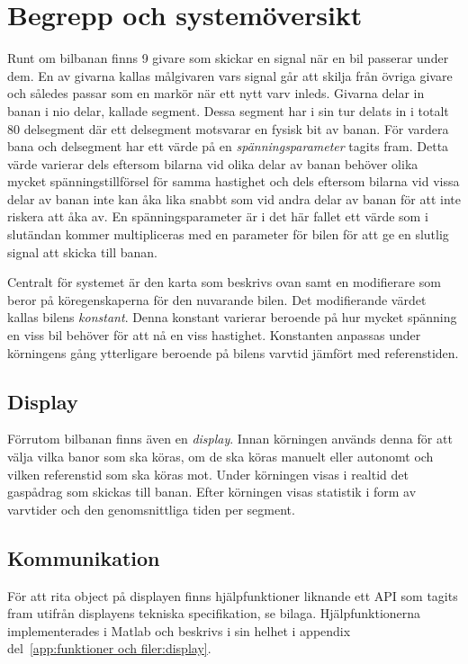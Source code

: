 \section{Begrepp och systemöversikt}
\label{sec:begrepp och systemöversikt}

Runt om bilbanan finns 9 givare som skickar en signal när en bil passerar under
dem. En av givarna kallas målgivaren vars signal går att skilja från övriga
givare och således passar som en markör när ett nytt varv inleds. Givarna
delar in banan i nio delar, kallade segment. Dessa segment har i sin tur delats
in i totalt 80 delsegment där ett delsegment motsvarar en fysisk bit av banan.
För vardera bana och delsegment har ett värde på en \emph{spänningsparameter}
tagits fram. Detta värde varierar dels eftersom bilarna vid olika delar av banan
behöver olika mycket spänningstillförsel för samma hastighet och dels eftersom
bilarna vid vissa delar av banan inte kan åka lika snabbt som vid andra delar av
banan för att inte riskera att åka av. En spänningsparameter är i det här fallet
ett värde som i slutändan kommer multipliceras med en parameter för bilen för
att ge en slutlig signal att skicka till banan.

Centralt för systemet är den karta som beskrivs ovan samt en
modifierare som beror på köregenskaperna för den nuvarande bilen. Det
modifierande värdet kallas bilens \emph{konstant}. Denna konstant varierar
beroende på hur mycket spänning en viss bil behöver för att nå en viss
hastighet. Konstanten anpassas under körningens gång ytterligare beroende på
bilens varvtid jämfört med referenstiden.

\subsection{Display}

Förrutom bilbanan finns även en \emph{display}. Innan körningen används denna för att välja vilka banor som ska köras, om de ska köras manuelt eller autonomt och vilken referenstid som ska köras mot. Under körningen visas i realtid det gaspådrag som skickas till banan. Efter körningen visas statistik i form av varvtider och den genomsnittliga tiden per segment.

\subsection{Kommunikation}

För att rita object på displayen finns hjälpfunktioner liknande ett API som
tagits fram utifrån displayens tekniska specifikation, se bilaga.
Hjälpfunktionerna implementerades i Matlab och beskrivs i sin helhet i appendix
del~\ref{app:funktioner och filer:display}.

